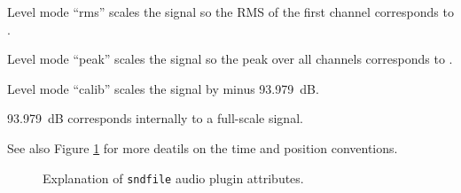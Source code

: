 Level mode ``rms'' scales the signal so the RMS of the first channel corresponds to .

Level mode ``peak'' scales the signal so the peak over all channels corresponds to .

Level mode ``calib'' scales the signal by  minus 93.979~dB.

93.979~dB corresponds internally to a full-scale signal.


See also Figure \ref{fig:ap_sndfile} for more deatils on the time and position conventions.

\begin{figure}[htb]
    \centering
    \caption{Explanation of {\tt sndfile} audio plugin attributes.}
    \label{fig:ap_sndfile}
\end{figure}

